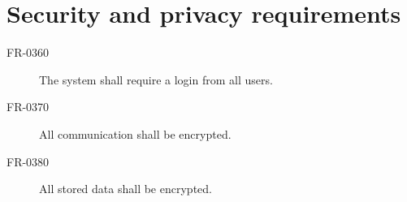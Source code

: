 \section{Security and privacy requirements}

\begin{description}
\item[FR-0360] The system shall require a login from all users.
\item[FR-0370] All communication shall be encrypted.
\item[FR-0380] All stored data shall be encrypted.
\end{description}